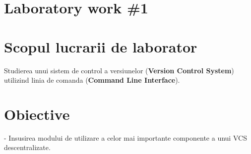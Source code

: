 \section*{Laboratory work \#1}

\section{Scopul lucrarii de laborator}

 Studierea unui sistem de control a versiunelor (\textbf{Version Control System}) utilizind linia de comanda (\textbf{Command Line Interface}).

\section{Obiective}

- Insusirea modului de utilizare a celor mai importante componente a unui VCS descentralizate.


\clearpage
